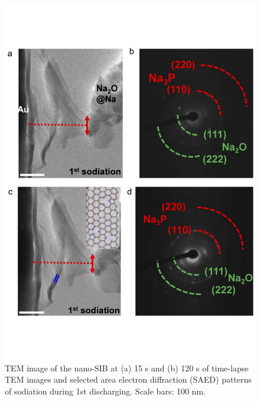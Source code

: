 \begin{figure}  
\centering
\includegraphics[width=320pt,angle=0]{figures/figure4_3cd}
\caption[{\em in situ} sodiation process of P@GN SIB]
{
 TEM image of the nano-SIB at (a) 15 s and (b) 120 s of time-lapse TEM images and selected area electron diffraction (SAED) patterns of sodiation during 1st discharging. Scale bars: 100 nm.
\label{fig:4_3cd}}
\end{figure}

